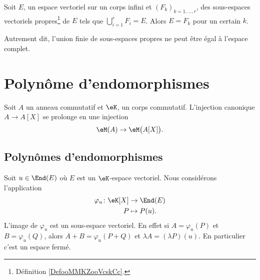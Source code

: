 \begin{proposition}   \label{PropTVKbxU}
    Soit \( E\), un espace vectoriel sur un corps infini et \( (F_k)_{k=1,\ldots, r}\), des sous-espaces vectoriels propres\footnote{Définition \ref{DefooMMKZooVcskCc}.} de \( E\) tels que \( \bigcup_{i=1}^rF_i=E\). Alors \( E=F_k\) pour un certain \( k\).

    Autrement dit, l'union finie de sous-espaces propres ne peut être égal à l'espace complet.
\end{proposition}

\section{Polynôme d'endomorphismes}
\label{SECooUEQVooLBrRiE}

Soit \( A\) un anneau commutatif et \( \eK\), un corps commutatif. L'injection canonique \( A\to A[X]\) se prolonge en une injection
\begin{equation}
   \eM(A)\to\eM\big( A[X] \big).
\end{equation}

\subsection{Polynômes d'endomorphismes}

Soit \( u\in\End(E)\) où \( E\) est un \( \eK\)-espace vectoriel. Nous considérons l'application
\begin{equation}    \label{EqOVKooeMJuv}
    \begin{aligned}
        \varphi_u\colon \eK[X]&\to \End(E) \\
        P&\mapsto P(u). 
    \end{aligned}
\end{equation}
L'image de \( \varphi_u\) est un sous-espace vectoriel. En effet si \( A=\varphi_u(P)\) et \( B=\varphi_u(Q)\), alors \( A+B=\varphi_u(P+Q)\) et \( \lambda A=(\lambda P)(u)\). En particulier c'est un espace fermé.

